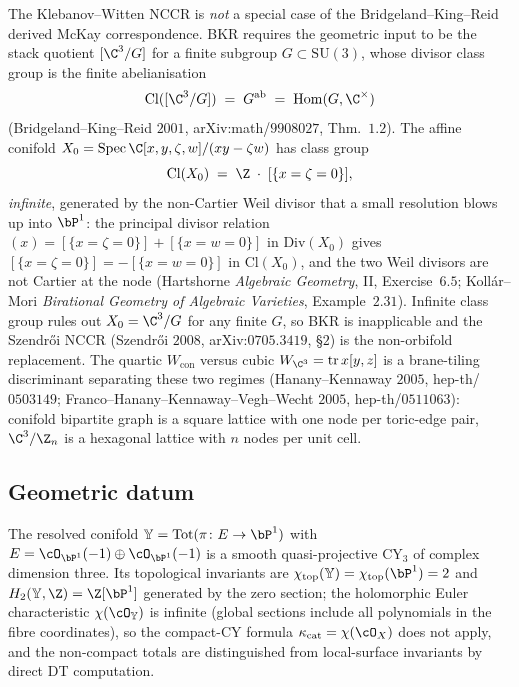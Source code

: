 \begin{remark}
\label{rem:kw-nccr-class-group-obstruction}
The Klebanov--Witten NCCR is \emph{not} a special case of the Bridgeland--King--Reid derived McKay correspondence. BKR requires the geometric input to be the stack quotient $[\C^3 / G]$ for a finite subgroup $G \subset \mathrm{SU}(3)$, whose divisor class group is the finite abelianisation
\[
 \mathrm{Cl}([\C^3/G]) \;=\; G^{\mathrm{ab}} \;=\; \mathrm{Hom}(G, \C^\times)
\]
(Bridgeland--King--Reid $2001$, arXiv:math/$9908027$, Thm.~$1.2$). The affine conifold $X_0 = \mathrm{Spec}\,\C[x,y,\zeta,w]/(xy - \zeta w)$ has class group
\[
 \mathrm{Cl}(X_0) \;=\; \Z \;\cdot\; [\{x = \zeta = 0\}],
\]
\emph{infinite}, generated by the non-Cartier Weil divisor that a small resolution blows up into $\bP^1$: the principal divisor relation $(x) = [\{x = \zeta = 0\}] + [\{x = w = 0\}]$ in $\mathrm{Div}(X_0)$ gives $[\{x = \zeta = 0\}] = -[\{x = w = 0\}]$ in $\mathrm{Cl}(X_0)$, and the two Weil divisors are not Cartier at the node (Hartshorne \emph{Algebraic Geometry}, II, Exercise~$6.5$; Koll\'ar--Mori \emph{Birational Geometry of Algebraic Varieties}, Example~$2.31$). Infinite class group rules out $X_0 = \C^3/G$ for any finite $G$, so BKR is inapplicable and the Szendr\H oi NCCR (Szendr\H oi $2008$, arXiv:$0705.3419$, \S$2$) is the non-orbifold replacement. The quartic $W_{\mathrm{con}}$ versus cubic $W_{\C^3} = \mathrm{tr}\,x[y,z]$ is a brane-tiling discriminant separating these two regimes (Hanany--Kennaway $2005$, hep-th/$0503149$; Franco--Hanany--Kennaway--Vegh--Wecht $2005$, hep-th/$0511063$): conifold bipartite graph is a square lattice with one node per toric-edge pair, $\C^3 / \Z_n$ is a hexagonal lattice with $n$ nodes per unit cell.
\end{remark}

\subsection{Geometric datum}
\label{subsec:conifold-geometric-datum}

The resolved conifold $\bY = \mathrm{Tot}(\pi\colon E \to \bP^1)$ with $E = \cO_{\bP^1}(-1) \oplus \cO_{\bP^1}(-1)$ is a smooth quasi-projective CY$_3$ of complex dimension three. Its topological invariants are $\chi_{\mathrm{top}}(\bY) = \chi_{\mathrm{top}}(\bP^1) = 2$ and $H_2(\bY, \Z) = \Z[\bP^1]$ generated by the zero section; the holomorphic Euler characteristic $\chi(\cO_\bY)$ is infinite (global sections include all polynomials in the fibre coordinates), so the compact-CY formula $\kappa_{\mathrm{cat}} = \chi(\cO_X)$ does not apply, and the non-compact totals are distinguished from local-surface invariants by direct DT computation.

